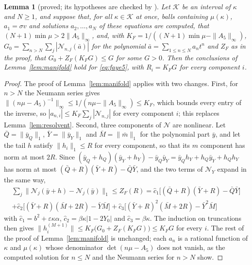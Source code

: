 \documentclass[11pt]{article}
\newtheorem{lemma}{Lemma}[section]
\theoremstyle{definition}
\newcommand{\eps}{\varepsilon}
\newcommand{\Kset}{\mathcal{K}}
\begin{document}
\begin{lemma}[proved; its hypotheses are checked by ]\label{lem:fayemanifold}
Let $\Kset$ be an interval of $\kappa$ and $N \ge 1$, and suppose that, for all $\kappa \in \Kset$ at once, balls containing $\mu(\kappa)$, $a_1 = \sigma v$ and solutions $a_2, \dots, a_N$ of these equations are computed, that $(N + 1)\min\mu > 2\|A_5\|_\infty$, and, with $K_F = 1/((N + 1)\min\mu - \|A_5\|_\infty)$, $G_0 = \sum_{n > N}\sum_j|\mathcal{N}_{n, j}(\bar a)|$ for the polynomial $\bar a = \sum_{1 \le n \le N}a_nt^n$ and $Z_F$ as in the proof, that $G_0 + Z_F(K_FG) \le G$ for some $G > 0$. Then the conclusions of Lemma~\ref{lem:manifold} hold for \eqref{eq:faye5}, with $R_i = K_FG$ for every component $i$.
\end{lemma}

\begin{proof}
The proof of Lemma~\ref{lem:manifold} applies with two changes. First, for $n > N$ the Neumann series gives $\|(n\mu - A_5)^{-1}\|_\infty \le 1/(n\mu - \|A_5\|_\infty) \le K_F$, which bounds every entry of the inverse, so $|a_{n, i}| \le K_F\sum_j|\mathcal{N}_{n, j}|$ for every component $i$; this replaces Lemma~\ref{lem:resolvent}. Second, three components of $\mathcal{N}$ are nonlinear. Let $\bar Q = \|\bar y_Q\|_1$, $\bar Y = \|\bar y_Y\|_1$ and $\bar M = \|\bar m\|_1$ for the polynomial part $\bar y$, and let the tail $h$ satisfy $\|h_i\|_1 \le R$ for every component, so that its $m$ component has norm at most $2R$. Since $(\bar y_Q + h_Q)(\bar y_Y + h_Y) - \bar y_Q\bar y_Y = \bar y_Qh_Y + h_Q\bar y_Y + h_Qh_Y$ has norm at most $(\bar Q + R)(\bar Y + R) - \bar Q\bar Y$, and the two terms of $\mathcal{N}_Y$ expand in the same way,
\begin{multline*}
  \sum_j\|\mathcal{N}_j(\bar y + h) - \mathcal{N}_j(\bar y)\|_1 \le Z_F(R) = \hat c_1\bigl[(\bar Q + R)(\bar Y + R) - \bar Q\bar Y\bigr] \\
  + \hat c_2\bigl[(\bar Y + R)(\bar M + 2R) - \bar Y\bar M\bigr] + \hat c_3\bigl[(\bar Y + R)^2(\bar M + 2R) - \bar Y^2\bar M\bigr]
\end{multline*}
with $\hat c_1 = b^2 + \eps\kappa\alpha$, $\hat c_2 = \beta\kappa|1 - 2Y_0|$ and $\hat c_3 = \beta\kappa$. The induction on truncations then gives $\|h^{(M+1)}_i\| \le K_F\bigl(G_0 + Z_F(K_FG)\bigr) \le K_FG$ for every $i$. The rest of the proof of Lemma~\ref{lem:manifold} is unchanged; each $a_n$ is a rational function of $\kappa$ and $\mu(\kappa)$ whose denominator $\det(n\mu - A_5)$ does not vanish, as the computed solution for $n \le N$ and the Neumann series for $n > N$ show.
\end{proof}
\end{document}
